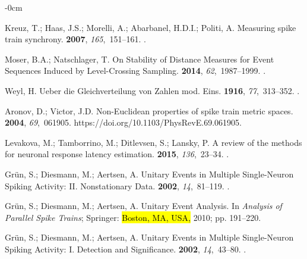 \documentclass[brainsci, %
               review,accept,pdftex,moreauthors
               ]{Definitions/mdpi}
\begin{document}
\begin{adjustwidth}{-\extralength}{0cm}
\begin{thebibliography}{999}
Kreuz, T.; Haas, J.S.; Morelli, A.; Abarbanel, H.D.I.; Politi, A.
\newblock Measuring spike train synchrony.
 {\bf 2007}, {\em
  165},~151--161.
.

Moser, B.A.; Natschlager, T.
\newblock On {Stability} of {Distance} {Measures} for {Event} {Sequences}
  {Induced} by {Level}-{Crossing} {Sampling}.
 {\bf 2014}, {\em
  62},~1987--1999.
.

Weyl, H.
\newblock Ueber die {Gleichverteilung} von {Zahlen} mod. {Eins}.
 {\bf 1916}, {\em 77},~313--352.
.

Aronov, D.; Victor, J.D.
\newblock Non-{Euclidean} properties of spike train metric spaces.
 {\bf 2004}, {\em 69},~061905.
  {{https://doi.org/10.1103/PhysRevE.69.061905}}.

Levakova, M.; Tamborrino, M.; Ditlevsen, S.; Lansky, P.
\newblock A review of the methods for neuronal response latency estimation.
 {\bf 2015}, {\em 136},~23--34.
.

Grün, S.; Diesmann, M.; Aertsen, A.
\newblock Unitary {Events} in {Multiple} {Single}-{Neuron} {Spiking}
  {Activity}: {II}. {Nonstationary} {Data}.
 {\bf 2002}, {\em 14},~81--119.
.

Grün, S.; Diesmann, M.; Aertsen, A.
\newblock Unitary {Event} {Analysis}. In {\em Analysis of {Parallel} {Spike}
  {Trains}}; Springer: \hl{Boston, MA, USA,} %
  2010; pp. 191--220.

Grün, S.; Diesmann, M.; Aertsen, A.
\newblock Unitary {Events} in {Multiple} {Single}-{Neuron} {Spiking}
  {Activity}: {I}. {Detection} and {Significance}.
 {\bf 2002}, {\em 14},~43--80.
.


\end{thebibliography}
\end{adjustwidth}
\end{document}
